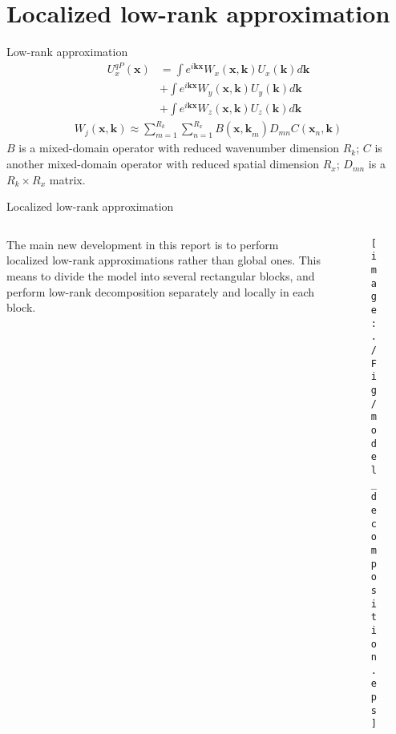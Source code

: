 \documentclass[aspectratio=169]{beamer}
\begin{document}
\section{Localized low-rank approximation}
\begin{frame}{Low-rank approximation}
\begin{eqnarray*}
U^{qP}_x(\mathbf{x})&=\int e^{i\mathbf{kx}}W_x(\mathbf{x,k})U_x(\mathbf{k})d\mathbf{k}\\
                    &+\int e^{i\mathbf{kx}}W_y(\mathbf{x,k})U_y(\mathbf{k})d\mathbf{k}\\
                    &+\int e^{i\mathbf{kx}}W_z(\mathbf{x,k})U_z(\mathbf{k})d\mathbf{k}
\end{eqnarray*}
\begin{eqnarray*}
W_j(\mathbf{x,k})\approx \sum^{R_k}_{m=1}\sum^{R_x}_{n=1}B(\mathbf{x,k}_{m})D_{m n}C(\mathbf{x}_{n},\mathbf{k})
\end{eqnarray*}
$B$ is a mixed-domain operator with reduced wavenumber dimension $R_k$; $C$ is another mixed-domain operator with reduced spatial dimension $R_x$; $D_{m n}$ is a $R_k \times R_x$ matrix. 
\end{frame}
\begin{frame}{Localized low-rank approximation}

\begin{columns}
  \begin{column}{0.50\textwidth}
The main new development in this report is to perform localized low-rank approximations rather than global ones. This means to divide the model into several rectangular blocks, and perform low-rank decomposition separately and locally in each block. 
  \end{column}
  \begin{column}{0.50\textwidth}
  \begin{figure}
  \texttt{[image: ./Fig/model\_decomposition.eps]}
  \end{figure}
  \end{column}
\end{columns}

\end{frame}
\end{document}
